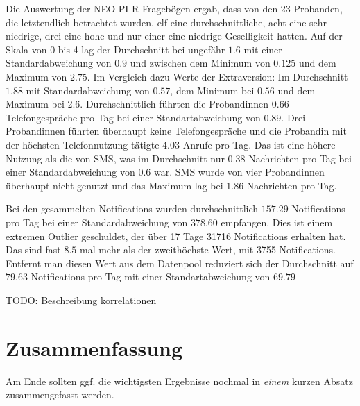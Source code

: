 Die Auswertung der NEO-PI-R Fragebögen ergab, dass von den 23 Probanden, die letztendlich betrachtet wurden, elf eine durchschnittliche, acht eine sehr niedrige, drei eine hohe und nur einer eine niedrige Geselligkeit hatten.
Auf der Skala von 0 bis 4 lag der Durchschnitt bei ungefähr $1.6$ mit einer Standardabweichung von $0.9$ und zwischen dem Minimum von $0.125$ und dem Maximum von $2.75$.
Im Vergleich dazu Werte der Extraversion:
Im Durchschnitt $1.88$ mit Standardabweichung von $0.57$, dem Minimum bei $0.56$ und dem Maximum bei $2.6$.
Durchschnittlich führten die Probandinnen $0.66$ Telefongespräche pro Tag bei einer Standartabweichung von $0.89$.
Drei Probandinnen führten überhaupt keine Telefongespräche und die Probandin mit der höchsten Telefonnutzung tätigte $4.03$ Anrufe pro Tag.
Das ist eine höhere Nutzung als die von SMS, was im Durchschnitt nur $0.38$ Nachrichten pro Tag bei einer Standardabweichung von $0.6$ war.
SMS wurde von vier Probandinnen überhaupt nicht genutzt und das Maximum lag bei $1.86$ Nachrichten pro Tag.
\par
Bei den gesammelten Notifications wurden durchschnittlich $157.29$ Notifications pro Tag bei einer Standardabweichung von $378.60$ empfangen.
Dies ist einem extremen Outlier geschuldet, der über 17 Tage 31716 Notifications erhalten hat. 
Das sind fast $8.5$ mal mehr als der zweithöchste Wert, mit 3755 Notifications.
Entfernt man diesen Wert aus dem Datenpool reduziert sich der Durchschnitt auf $79.63$ Notifications pro Tag mit einer Standartabweichung von $69.79$

\par
TODO: Beschreibung korrelationen


\section{Zusammenfassung}
\label{ch:Evaluierung:sec:zusammenfassung}

Am Ende sollten ggf. die wichtigsten Ergebnisse nochmal in \emph{einem}
kurzen Absatz zusammengefasst werden.

